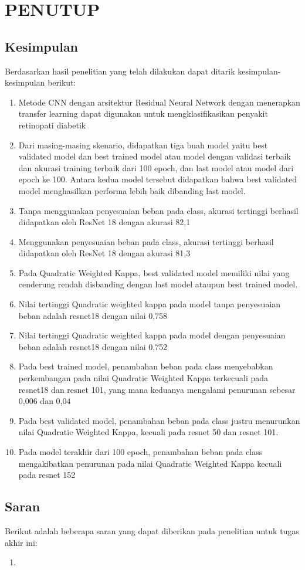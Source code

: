 \chapter{PENUTUP}
\label{chap:penutup}


\section{Kesimpulan}
\label{sec:kesimpulan}

Berdasarkan hasil penelitian yang telah dilakukan dapat ditarik kesimpulan-kesimpulan berikut:

\begin{enumerate}[nolistsep]
	
\item Metode CNN dengan arsitektur Residual Neural Network dengan menerapkan transfer learning dapat digunakan untuk mengklasifikasikan penyakit retinopati diabetik
\item Dari masing-masing skenario, didapatkan tiga buah model yaitu best validated model dan best trained model atau model dengan validasi terbaik dan akurasi training terbaik dari 100 epoch, dan last model atau model dari epoch ke 100. Antara kedua model tersebut didapatkan bahwa best validated model menghasilkan performa lebih baik dibanding last model.
\item Tanpa menggunakan penyesuaian beban pada class, akurasi tertinggi berhasil didapatkan oleh ResNet 18 dengan akurasi 82,1%
\item Menggunakan penyesuaian beban pada class, akurasi tertinggi berhasil didapatkan oleh ResNet 18 dengan akurasi 81,3%
\item Pada Quadratic Weighted Kappa, best validated model memiliki nilai yang cenderung rendah disbanding dengan last model ataupun best trained model. 
\item Nilai tertinggi Quadratic weighted kappa pada model tanpa penyesuaian beban adalah resnet18 dengan nilai 0,758
\item Nilai tertinggi Quadratic weighted kappa pada model dengan penyesuaian beban adalah resnet18 dengan nilai 0,752
\item Pada best trained model, penambahan beban pada class menyebabkan perkembangan pada nilai Quadratic Weighted Kappa terkecuali pada resnet18 dan resnet 101, yang mana keduanya mengalami penurunan sebesar 0,006 dan 0,04
\item Pada best validated model, penambahan beban pada class justru menurunkan nilai Quadratic Weighted Kappa, kecuali pada resnet 50 dan resnet 101.
\item Pada model terakhir dari 100 epoch, penambahan beban pada class mengakibatkan penurunan pada nilai Quadratic Weighted Kappa kecuali pada resnet 152


\end{enumerate}

\section{Saran}
\label{chap:saran}

Berikut adalah beberapa saran yang dapat diberikan pada penelitian untuk tugas akhir ini:

\begin{enumerate}[nolistsep]
	
\item 

\end{enumerate}
